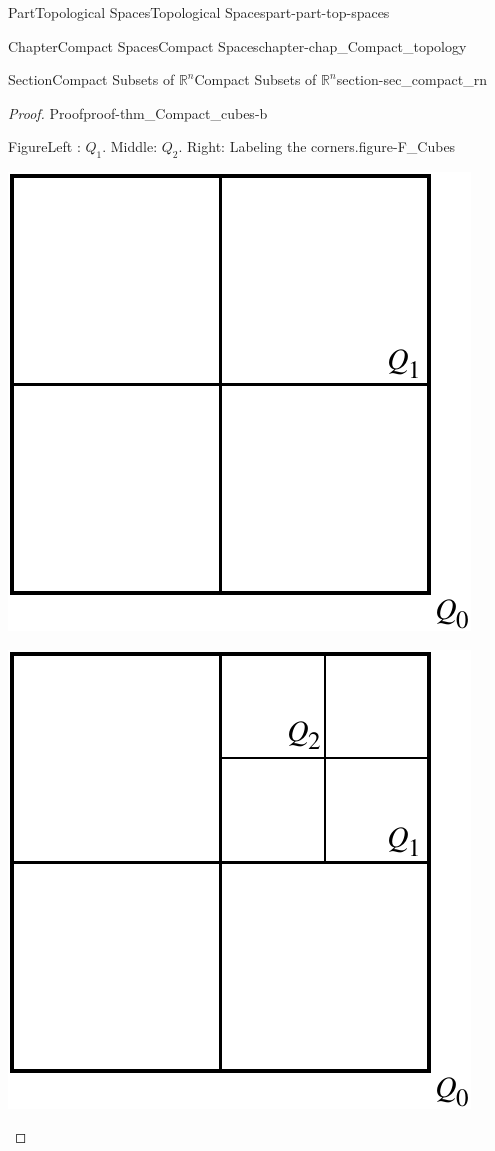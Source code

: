 \documentclass[oneside,10pt,]{book}
\numberwithin{equation}{chapter}
\newcommand{\R}{\mathbb{R}}
\begin{document}
\begin{partptx}{Part}{Topological Spaces}{}{Topological Spaces}{}{}{part-part-top-spaces}
\begin{chapterptx}{Chapter}{Compact Spaces}{}{Compact Spaces}{}{}{chapter-chap_Compact_topology}
\begin{sectionptx}{Section}{Compact Subsets of \(\R^n\)}{}{Compact Subsets of \(\R^n\)}{}{}{section-sec_compact_rn}
\begin{proof}{Proof}{}{proof-thm_Compact_cubes-b}
\begin{figureptx}{Figure}{Left : \(Q_1\). Middle: \(Q_2\). Right: Labeling the corners.}{figure-F_Cubes}{}
\begin{sidebyside}{3}{0}{0}{0}
\begin{sbspanel}{0.333333333333333}
\includegraphics[width=\linewidth]{external/HB_cube.pdf}
\end{sbspanel}%
\begin{sbspanel}{0.333333333333333}%
\includegraphics[width=\linewidth]{external/HB_cube_2.pdf}

\end{sbspanel}
\end{sidebyside}
\end{figureptx}
\end{proof}
\end{sectionptx}
\end{chapterptx}
\end{partptx}
\end{document}
